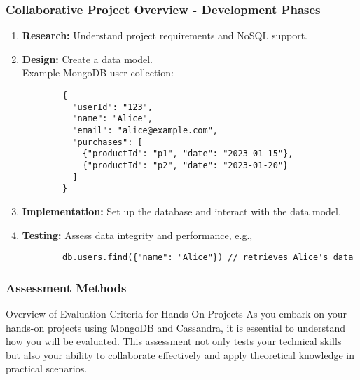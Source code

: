 \documentclass[aspectratio=169]{beamer}
\begin{document}
\begin{frame}[fragile]
    \frametitle{Collaborative Project Overview - Development Phases}
    \begin{enumerate}
        \item \textbf{Research:} Understand project requirements and NoSQL support.
        
        \item \textbf{Design:} Create a data model. \\
        Example MongoDB user collection:
        \begin{lstlisting}
        {
          "userId": "123",
          "name": "Alice",
          "email": "alice@example.com",
          "purchases": [
            {"productId": "p1", "date": "2023-01-15"},
            {"productId": "p2", "date": "2023-01-20"}
          ]
        }
        \end{lstlisting}
        
        \item \textbf{Implementation:} Set up the database and interact with the data model.

        \item \textbf{Testing:} Assess data integrity and performance, e.g.,
        \begin{lstlisting}
        db.users.find({"name": "Alice"}) // retrieves Alice's data
        \end{lstlisting}
    \end{enumerate}
\end{frame}

\begin{frame}
    \frametitle{Assessment Methods}
    \begin{block}{Overview of Evaluation Criteria for Hands-On Projects}
        As you embark on your hands-on projects using MongoDB and Cassandra, 
        it is essential to understand how you will be evaluated. This assessment 
        not only tests your technical skills but also your ability to collaborate 
        effectively and apply theoretical knowledge in practical scenarios.
    \end{block}
\end{frame}
\end{document}
